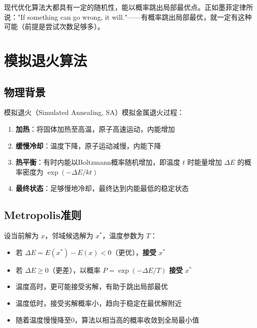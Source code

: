 \begin{notebox}[概率算法与墨菲定律]
现代优化算法大都具有一定的随机性，能以概率跳出局部最优点。正如墨菲定律所说："If something can go wrong, it will."——有概率跳出局部最优，就一定有这种可能（前提是尝试次数足够多）。
\end{notebox}

\section{模拟退火算法}\label{sec:sa}

\subsection{物理背景}

模拟退火（Simulated Annealing, SA）模拟金属退火过程：
\begin{enumerate}[label=\arabic*., leftmargin=2em]
    \item \textbf{加热}：将固体加热至高温，原子高速运动，内能增加
    \item \textbf{缓慢冷却}：温度下降，原子运动减慢，内能下降
    \item \textbf{热平衡}：有时内能以Boltzmann概率随机增加，即温度 $t$ 时能量增加 $\Delta E$ 的概率密度为 $\exp(-\Delta E / kt)$
    \item \textbf{最终状态}：足够慢地冷却，最终达到内能最低的稳定状态
\end{enumerate}

\subsection{Metropolis准则}

\begin{definition}[Metropolis接受准则]
设当前解为 $x$，邻域候选解为 $x^*$，温度参数为 $T$：
\begin{itemize}
    \item 若 $\Delta E = E(x^*) - E(x) < 0$（更优），\textbf{接受} $x^*$
    \item 若 $\Delta E \geq 0$（更差），以概率 $P = \exp(-\Delta E / T)$ \textbf{接受} $x^*$
\end{itemize}
\end{definition}

\begin{notebox}[模拟退火的关键机制]
\begin{itemize}[itemsep=0.3em]
    \item 温度高时，更可能接受劣解，有助于跳出局部最优
    \item 温度低时，接受劣解概率小，趋向于稳定在最优解附近
    \item 随着温度慢慢降至0，算法以相当高的概率收敛到全局最小值
\end{itemize}
\end{notebox}

